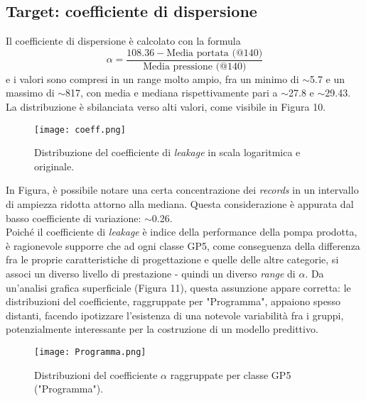 \documentclass[fleqn,10pt]{SelfArx} %
\begin{document}
\subsection{Target: coefficiente di dispersione}
Il coefficiente di dispersione è calcolato con la formula
\begin{equation}\label{eq}
    \alpha=\frac{108.36-\text{Media portata (@140)}}{\text{Media pressione (@140)}}
\end{equation}
e i valori sono compresi in un range molto ampio, fra un minimo di $\sim$5.7 e un massimo di $\sim$817, con media e mediana rispettivamente pari a $\sim$27.8 e $\sim$29.43. La distribuzione è sbilanciata verso alti valori, come visibile in Figura 10.
\begin{figure}[h]
    \centering
    \texttt{[image: coeff.png]}
    \label{fig:em}
    \caption{Distribuzione del coefficiente di \textit{leakage} in scala logaritmica e originale.}
\end{figure}
In Figura, è possibile notare una certa concentrazione dei \textit{records} in un intervallo di ampiezza ridotta attorno alla mediana. Questa considerazione è appurata dal basso coefficiente di variazione: $\sim$0.26.\\
Poiché il coefficiente di \textit{leakage} è indice della performance della pompa prodotta, è ragionevole supporre che ad ogni classe GP5, come conseguenza della differenza fra le proprie caratteristiche di progettazione e quelle delle altre categorie, si associ un diverso livello di prestazione - quindi un diverso \textit{range} di $\alpha$. Da un'analisi grafica superficiale (Figura 11), questa assunzione appare corretta: le distribuzioni del coefficiente, raggruppate per "Programma", appaiono spesso distanti, facendo ipotizzare l'esistenza di una notevole variabilità fra i gruppi, potenzialmente interessante per la costruzione di un modello predittivo. 
\begin{figure}[h]
    \centering
    \texttt{[image: Programma.png]}
    \label{fig:em}
    \caption{Distribuzioni del coefficiente $\alpha$ raggruppate per classe GP5 ("Programma").}
\end{figure}
\end{document}
